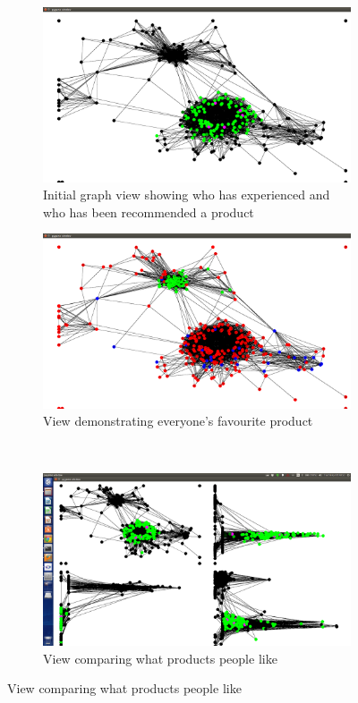 \documentclass[12pt,a4paper]{article}
\begin{document}
\begin{figure}[htb]
\centering
\captionsetup[subfigure]{justification=centering}
	\begin{subfigure}[b]{0.4\linewidth}
	\caption{Initial graph view showing who has experienced and who has been recommended a product}
	\label{fig:recommendationInitial}
	\includegraphics[scale=0.1]{Recommendation1.png}
	\end{subfigure}
\quad
	\begin{subfigure}[b]{0.4\linewidth}
	\caption{View demonstrating everyone's favourite product}
	\label{fig:recommendationFavourite}
	\includegraphics[scale=0.1]{Recommendation2.png}
	\end{subfigure}
\\	
	\begin{subfigure}[b]{0.4\linewidth}
	\caption{View comparing what products people like}
	\label{fig:recommendationComparison}
	\includegraphics[scale=0.1]{Recommendation3.png}

\end{subfigure}
\end{figure}
\end{document}
